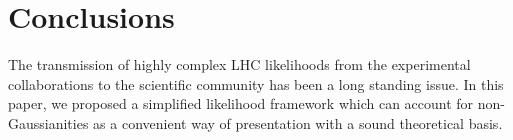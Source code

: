 \documentclass[11pt]{article}
\begin{document}
%
%


\section{Conclusions}
\label{se:conclusions}


The transmission of highly complex LHC likelihoods 
from the experimental collaborations to the scientific community
 has been a long standing issue. %
In this paper, we proposed a simplified likelihood framework which can account for non-Gaussianities as a convenient way of presentation 
with a sound theoretical basis. %
\end{document}
